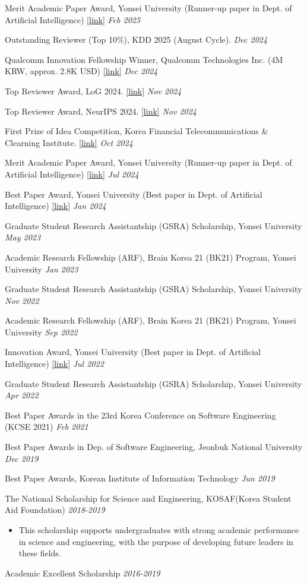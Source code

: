 \documentclass[10pt]{article}
\newenvironment{changemargin}[2]{
  \begin{list}{}{
    \setlength{\topsep}{0pt}
    \setlength{\leftmargin}{#1}
    \setlength{\rightmargin}{#2}
    \setlength{\listparindent}{\parindent}
    \setlength{\itemindent}{\parindent}
    \setlength{\parsep}{\parskip}
  }
  \item[]}{\end{list}
}
\newcommand{\award}[2]{
	{#1} \hfill \emph{#2}\\ \medskip
}
\newenvironment{body} {
	\vspace*{-16pt}
	\begin{changemargin}{-0.25in}{-0.5in}
  }
	{\end{changemargin}
}
\begin{document}
\begin{body}
	\vspace{14pt}
\award{Merit Academic Paper Award, Yonsei University (Runner-up paper in Dept. of Artificial Intelligence) \href{https://graduate.yonsei.ac.kr/graduate/board/news.do?mode=view&articleNo=220032&article.offset=0&articleLimit=10}{[link]}} {Feb 2025} 
\award{Outstanding Reviewer (Top 10\%), KDD 2025 (August Cycle).} {Dec 2024}
\award{Qualcomm Innovation Fellowship Winner, Qualcomm Technologies Inc. (4M KRW, approx. 2.8K USD) \href{https://www.qualcomm.com/research/university-relations/innovation-fellowship/2024-south-korea}{[link]}} {Dec 2024} 
\award{Top Reviewer Award, LoG 2024. \href{https://x.com/LogConference/status/1862602407395697123}{[link]}} {Nov 2024}
\award{Top Reviewer Award, NeurIPS 2024. \href{https://neurips.cc/Conferences/2024/ProgramCommittee\#top-reviewers}{[link]}} {Nov 2024}
\award{First Prize of Idea Competition, Korea Financial Telecommunications \& Clearning Institute. \href{https://drive.google.com/file/d/1--cUGRX6rB9rc2phbMeIJ7BdHRNCj_au/view?usp=sharing}{[link]}} {Oct 2024}
\award{Merit Academic Paper Award, Yonsei University (Runner-up paper in Dept. of Artificial Intelligence) \href{https://graduate.yonsei.ac.kr/graduate/board/news.do?mode=view&articleNo=208151&article.offset=0&articleLimit=10}{[link]}} {Jul 2024} 
\award{Best Paper Award, Yonsei University (Best paper in Dept. of Artificial Intelligence) \href{https://graduate.yonsei.ac.kr/graduate/board/news.do?mode=view&articleNo=181558&article.offset=0&articleLimit=10}{[link]}} {Jan 2024} 
\award{Graduate Student Research Assistantship (GSRA) Scholarship, Yonsei University}{May 2023}
\award{Academic Research Fellowship (ARF), Brain Korea 21 (BK21) Program, Yonsei University}{Jan 2023}
\award{Graduate Student Research Assistantship (GSRA) Scholarship, Yonsei University}{Nov 2022}
\award{Academic Research Fellowship (ARF), Brain Korea 21 (BK21) Program, Yonsei University}{Sep 2022}
\award{Innovation Award, Yonsei University (Best paper in Dept. of Artificial Intelligence) \href{https://www.yonsei.ac.kr/ocx/news.jsp?mode=view&ar_seq=20220708141917269049&sr_volume=632&list_mode=list&sr_site=S&pager.offset=0&sr_cates=29}{[link]}}{Jul 2022}
\award{Graduate Student Research Assistantship (GSRA) Scholarship, Yonsei University}{Apr 2022}
\award{Best Paper Awards in the 23rd Korea Conference on Software Engineering (KCSE 2021)}{Feb 2021}
\award{Best Paper Awards in Dep. of Software Engineering, Jeonbuk National University}{Dec 2019}
\award{Best Paper Awards, Korean Institute of Information Technology}{Jun 2019}
\award{The National Scholarship for Science and Engineering, KOSAF(Korea Student Aid Foundation)}{2018-2019}
    \begin{itemize} \itemsep -0pt  %
      \item This scholarship supports undergraduates with strong academic performance in science and engineering, with the purpose of developing future leaders in these fields.
  	\end{itemize}
\award{Academic Excellent Scholarship}{2016-2019}
\end{body}
\end{document}
